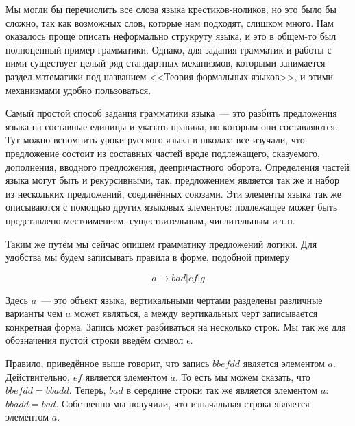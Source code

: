Мы могли бы перечислить все слова языка крестиков-ноликов, но это было бы сложно, так как возможных слов, которые нам подходят, слишком много. Нам оказалось проще описать неформально струкруту языка, и это в общем-то был полноценный пример грамматики. Однако, для задания грамматик и работы с ними существует целый ряд стандартных механизмов, которыми занимается раздел математики под названием <<Теория формальных языков>>, и этими механизмами удобно пользоваться.

Самый простой способ задания грамматики языка~--- это разбить предложения языка на составные единицы и указать правила, по которым они составляются. Тут можно вспомнить уроки русского языка в школах: все изучали, что предложение состоит из составных частей вроде подлежащего, сказуемого, дополнения, вводного предложения, деепричастного оборота. Определения частей языка могут быть и рекурсивными, так, предложением является так же и набор из нескольких предложений, соединённых союзами. Эти элементы языка так же описываются с помощью других языковых элементов: подлежащее может быть представлено местоимением, существительным, числительным и т.п.

Таким же путём мы сейчас опишем грамматику предложений логики. Для удобства мы будем записывать правила в форме, подобной примеру

$$a \to bad | ef | g$$

Здесь $a$~--- это объект языка, вертикальными чертами разделены различные варианты чем $a$ может являться, а между вертикальных черт записывается конкретная форма. Запись может разбиваться на несколько строк. Мы так же для обозначения пустой строки введём символ $\epsilon$.

\begin{example}
Правило, приведённое выше говорит, что запись  $bbefdd$ является элементом $a$. Действительно, $ef$ является элементом $a$. То есть мы можем сказать, что $bbefdd = bbadd$. Теперь, $bad$ в середине строки так же является элементом $a$: $bbadd = bad$. Собственно мы получили, что изначальная строка является элементом $a$.
\end{example}

